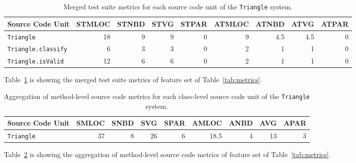 \begin{landscape}
  \begin{table}[h]
    \centering
    \begin{tabular}{|l|r|r|r|r|r|r|r|r|}
      \hline
      \rowcolor[RGB]{169,196,223}
      \textbf{Source Code Unit} & \textbf{STMLOC} & \textbf{STNBD} & \textbf{STVG} & \textbf{STPAR} & \textbf{ATMLOC} & \textbf{ATNBD} & \textbf{ATVG} & \textbf{ATPAR}  \\
      \hline \texttt{Triangle} & 18 & 9 & 9 & 0 & 9 & 4.5 & 4.5 & 0 \\
      \hline \texttt{Triangle.classify} & 6 & 3 & 3 & 0 & 2 & 1 & 1 & 0 \\
      \hline \texttt{Triangle.isValid} & 12 & 6 & 6 & 0 & 2 & 1 & 1 & 0 \\
      \hline
    \end{tabular}
    \caption{Merged test suite metrics for each source code unit of the \texttt{Triangle} system.}
    \vspace{1mm}
    \footnotesize{Table~\ref{tab:triangle_merge_test_metrics} is showing the merged test suite metrics of feature set  of Table~\ref{tab:metrics}.}
    \vspace{1mm}
    \label{tab:triangle_merge_test_metrics}
  \end{table}

  \begin{table}[h]
    \centering
    \begin{tabular}{|l|r|r|r|r|r|r|r|r|}
      \hline
      \rowcolor[RGB]{169,196,223}
      \textbf{Source Code Unit} & \textbf{SMLOC} & \textbf{SNBD} & \textbf{SVG} & \textbf{SPAR} & \textbf{AMLOC} & \textbf{ANBD} & \textbf{AVG} & \textbf{APAR}  \\
      \hline \texttt{Triangle} & 37 & 8 & 26 & 6 & 18.5 & 4 & 13 & 3 \\
      \hline
    \end{tabular}
    \caption{Aggregation of method-level source code metrics for each class-level source code unit of the \texttt{Triangle} system.}
    \vspace{1mm}
    \footnotesize{Table~\ref{tab:triangle_aggregate_metrics} is showing the aggregation of method-level source code metrics of feature set  of Table~\ref{tab:metrics}.}
    \vspace{1mm}
    \label{tab:triangle_aggregate_metrics}
  \end{table}
\end{landscape}


